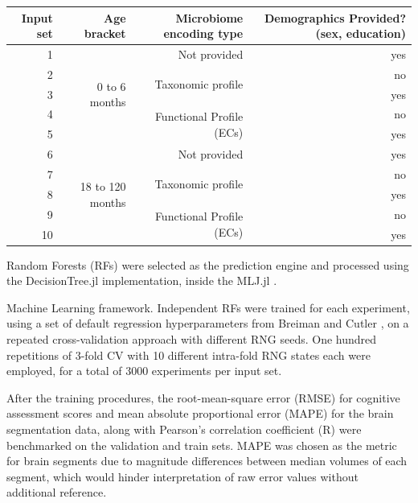 \documentclass{article}
\begin{document}
\begin{table}
    \begin{tabular}{|r|r|r|r|}
      \hline\hline
      \textbf{Input set} & \textbf{Age bracket} & \textbf{Microbiome encoding type} & \textbf{Demographics Provided? (sex, education)} \\\hline
      1 & \multirow{5}{*}{0 to 6 months} & Not provided & yes \\ \cline{3-4}
      2 &  & \multirow{2}{*}{Taxonomic profile} & no \\ \cline{4-4}
      3 &  &  & yes \\ \cline{3-4}
      4 &  & \multirow{2}{*}{Functional Profile (ECs)} & no \\ \cline{4-4}
      5 &  &  & yes \\ \cline{2-4}
      6 & \multirow{5}{*}{18 to 120 months} & Not provided & yes \\ \cline{3-4}
      7 &  & \multirow{2}{*}{Taxonomic profile} & no \\ \cline{4-4}
      8 &  &  & yes \\ \cline{3-4}
      9 &  & \multirow{2}{*}{Functional Profile (ECs)} & no \\ \cline{4-4}
      10 &  &  & yes \\\hline\hline
    \end{tabular}
\end{table}

Random Forests (RFs)
\cite{breimanRandomForests2001}
were selected as the prediction engine and processed using the
DecisionTree.jl \cite{sadeghiDecisionTreeJlJulia2022}
implementation, inside the MLJ.jl \cite{blaomMLJJuliaPackage2020}.

Machine Learning framework. Independent RFs were trained for each
experiment, using a set of default regression hyperparameters from
Breiman and Cutler \cite{breimanRandomForests2001},
on a repeated cross-validation approach with different RNG seeds. One hundred
repetitions of 3-fold CV with 10 different intra-fold RNG states each
were employed, for a total of 3000 experiments per input set.

After the training procedures, the root-mean-square error (RMSE) for
cognitive assessment scores and mean absolute proportional error (MAPE)
for the brain segmentation data, along with Pearson's
correlation coefficient (R) were benchmarked on the validation and train
sets. MAPE was chosen as the metric for brain segments due to magnitude
differences between median volumes of each segment, which would hinder
interpretation of raw error values without additional reference.
\end{document}
